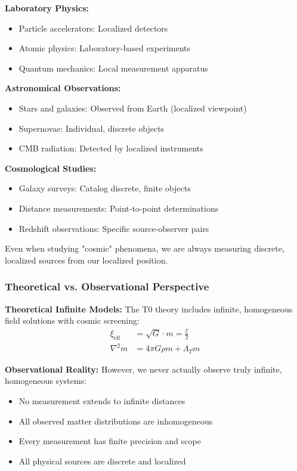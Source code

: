 \documentclass[12pt,a4paper]{article}
\begin{document}
\textbf{Laboratory Physics:}
\begin{itemize}
	\item Particle accelerators: Localized detectors
	\item Atomic physics: Laboratory-based experiments
	\item Quantum mechanics: Local measurement apparatus
\end{itemize}

\textbf{Astronomical Observations:}
\begin{itemize}
	\item Stars and galaxies: Observed from Earth (localized viewpoint)
	\item Supernovae: Individual, discrete objects  
	\item CMB radiation: Detected by localized instruments
\end{itemize}

\textbf{Cosmological Studies:}
\begin{itemize}
	\item Galaxy surveys: Catalog discrete, finite objects
	\item Distance measurements: Point-to-point determinations
	\item Redshift observations: Specific source-observer pairs
\end{itemize}

Even when studying "cosmic" phenomena, we are always measuring discrete, localized sources from our localized position.

\subsubsection{Theoretical vs. Observational Perspective}
\label{subsubsec:theoretical_vs_observational}

\textbf{Theoretical Infinite Models:}
The T0 theory includes infinite, homogeneous field solutions with cosmic screening:
\begin{align}
	\xi_{\text{eff}} &= \sqrt{G} \cdot m = \frac{\xi}{2} \\
	\nabla^2 m &= 4\pi G \rho m + \Lambda_T m
\end{align}

\textbf{Observational Reality:}
However, we never actually observe truly infinite, homogeneous systems:
\begin{itemize}
	\item No measurement extends to infinite distances
	\item All observed matter distributions are inhomogeneous
	\item Every measurement has finite precision and scope
	\item All physical sources are discrete and localized
\end{itemize}
\end{document}
